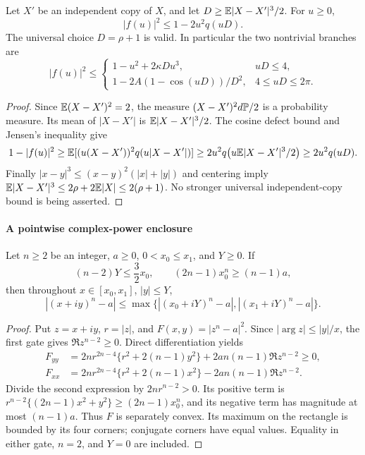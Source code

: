 \begin{lemma}\label{ms:fourier:afcore:lem:modulus}
Let $X'$ be an independent copy of $X$, and let
$D\ge\mathbb E|X-X'|^3/2$. For $u\ge0$,
\begin{equation}\label{ms:fourier:afcore:eq:modulus}
 |f(u)|^2\le1-2u^2q(uD).
\end{equation}
The universal choice $D=\rho+1$ is valid. In particular the two
nontrivial branches are
\[
 |f(u)|^2\le
 \begin{cases}
  1-u^2+2\kappa Du^3,&uD\le4,\\
  1-2A(1-\cos(uD))/D^2,&4\le uD\le2\pi.
 \end{cases}
\]
\end{lemma}
\begin{proof}
Since $\mathbb E(X-X')^2=2$, the measure
$(X-X')^2d\mathbb P/2$ is a probability measure. Its mean of $|X-X'|$ is
$\mathbb E|X-X'|^3/2$. The cosine defect bound and Jensen's inequality give
\[
 1-|f(u)|^2
 \ge\mathbb E[(u(X-X'))^2q(u|X-X'|)]
 \ge2u^2q\bigl(u\mathbb E|X-X'|^3/2\bigr)
 \ge2u^2q(uD).
\]
Finally $|x-y|^3\le(x-y)^2(|x|+|y|)$ and centering imply
$\mathbb E|X-X'|^3\le2\rho+2\mathbb E|X|\le2(\rho+1)$.
No stronger universal independent-copy bound is being asserted.
\end{proof}

\paragraph{A pointwise complex-power enclosure}

\begin{lemma}\label{ms:fourier:afcore:lem:rectangle}
Let $n\ge2$ be an integer, $a\ge0$, $0<x_0\le x_1$, and $Y\ge0$.
If
\[
 (n-2)Y\le\frac32x_0,\qquad
 (2n-1)x_0^n\ge(n-1)a,
\]
then throughout $x\in[x_0,x_1]$, $|y|\le Y$,
\[
 |(x+iy)^n-a|
 \le\max\{|(x_0+iY)^n-a|,|(x_1+iY)^n-a|\}.
\]
\end{lemma}
\begin{proof}
Put $z=x+iy$, $r=|z|$, and $F(x,y)=|z^n-a|^2$.
Since $|\arg z|\le|y|/x$, the first gate gives
$\Re z^{n-2}\ge0$. Direct differentiation yields
\begin{align*}
 F_{yy}&=2nr^{2n-4}\{r^2+2(n-1)y^2\}
             +2an(n-1)\Re z^{n-2}\ge0,\\
 F_{xx}&=2nr^{2n-4}\{r^2+2(n-1)x^2\}
             -2an(n-1)\Re z^{n-2}.
\end{align*}
Divide the second expression by $2nr^{n-2}>0$. Its positive term is
$r^{n-2}\{(2n-1)x^2+y^2\}\ge(2n-1)x_0^n$, and its negative term
has magnitude at most $(n-1)a$. Thus $F$ is separately convex.
Its maximum on the rectangle is bounded by its four corners; conjugate
corners have equal values. Equality in either gate, $n=2$, and $Y=0$
are included.
\end{proof}

